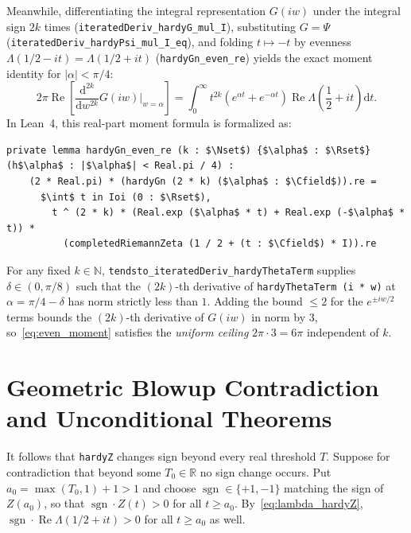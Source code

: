 \documentclass[11pt,a4paper]{article}
\theoremstyle{definition}
\newcommand{\dee}{\mathrm{d}}
\newcommand{\Nset}{\mathbb{N}}
\newcommand{\Rset}{\mathbb{R}}
\newcommand{\Cfield}{\mathbb{C}}
\begin{document}
Meanwhile, differentiating the integral representation $G(iw)$ under the integral sign $2k$ times (\texttt{iteratedDeriv\_\allowbreak hardyG\_\allowbreak mul\_I}), substituting $G = \Psi$ (\texttt{iteratedDeriv\_\allowbreak hardyPsi\_\allowbreak mul\_I\_eq}), and folding $t \mapsto -t$ by evenness $\Lambda(1/2-it) = \Lambda(1/2+it)$ (\texttt{hardyGn\_\allowbreak even\_re}) yields the exact moment identity for $|\alpha| < \pi/4$:
\begin{equation}\label{eq:even_moment}
2\pi \operatorname{Re}\!\left[\frac{\dee^{2k}}{\dee w^{2k}} G(iw)\Big|_{w=\alpha}\right]
= \int_0^\infty t^{2k}\left(e^{\alpha t} + e^{-\alpha t}\right) \operatorname{Re}\Lambda\!\left(\frac{1}{2} + it\right)\dee t.
\end{equation}
In Lean~4, this real-part moment formula is formalized as:
\begin{lstlisting}
private lemma hardyGn_even_re (k : $\Nset$) {$\alpha$ : $\Rset$} (h$\alpha$ : |$\alpha$| < Real.pi / 4) :
    (2 * Real.pi) * (hardyGn (2 * k) ($\alpha$ : $\Cfield$)).re =
      $\int$ t in Ioi (0 : $\Rset$),
        t ^ (2 * k) * (Real.exp ($\alpha$ * t) + Real.exp (-$\alpha$ * t)) *
          (completedRiemannZeta (1 / 2 + (t : $\Cfield$) * I)).re
\end{lstlisting}
For any fixed $k \in \Nset$, \texttt{tendsto\_\allowbreak iteratedDeriv\_\allowbreak hardyThetaTerm} supplies $\delta \in (0, \pi/8)$ such that the $(2k)$-th derivative of \texttt{hardyThetaTerm (i * w)} at $\alpha = \pi/4 - \delta$ has norm strictly less than $1$. Adding the bound $\le 2$ for the $e^{\pm iw/2}$ terms bounds the $(2k)$-th derivative of $G(iw)$ in norm by $3$, so~\eqref{eq:even_moment} satisfies the \emph{uniform ceiling} $2\pi \cdot 3 = 6\pi$ independent of $k$.

\section{Geometric Blowup Contradiction and Unconditional Theorems}\label{sec:main}

It follows that \texttt{hardyZ} changes sign beyond every real threshold $T$. Suppose for contradiction that beyond some $T_0 \in \Rset$ no sign change occurs. Put $a_0 = \max(T_0, 1) + 1 > 1$ and choose $\operatorname{sgn} \in \{+1, -1\}$ matching the sign of $Z(a_0)$, so that $\operatorname{sgn} \cdot Z(t) > 0$ for all $t \ge a_0$. By~\eqref{eq:lambda_hardyZ}, $\operatorname{sgn} \cdot \operatorname{Re}\Lambda(1/2 + it) > 0$ for all $t \ge a_0$ as well.
\end{document}
